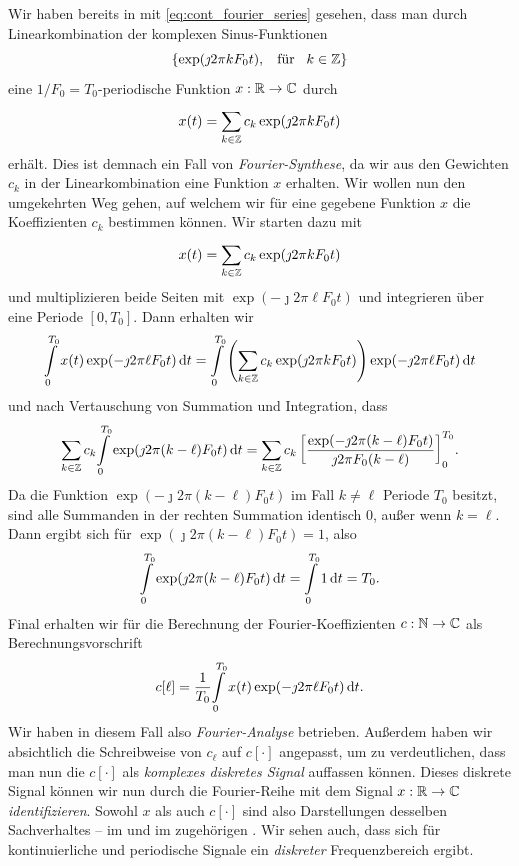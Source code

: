 Wir haben bereits in  mit \eqref{eq:cont_fourier_series} gesehen, dass man durch Linearkombination der komplexen Sinus-Funktionen
\[
\{\exp(\jmath 2 \pi k F_0 t), {\hspace{3mm} \text{f\"ur} \hspace{3mm}} k \in \mathbb{Z}\}
\]
eine $1/F_0=T_0$-periodische Funktion $x: \mathbb{R} \rightarrow \mathbb{C}$ durch
\[
x(t) = {\sum\limits_{k \in \mathbb{Z}}^{}{c_k \exp(\jmath 2 \pi k F_0 t)}}
\]
erhält.
Dies ist demnach ein Fall von \emph{Fourier-Synthese}, da wir aus den Gewichten $c_k$ in der Linearkombination eine Funktion $x$ erhalten.
Wir wollen nun den umgekehrten Weg gehen, auf welchem wir für eine gegebene Funktion $x$ die Koeffizienten $c_k$ bestimmen können.
Wir starten dazu mit 
\begin{equation}\label{eq:fourier:fourier_series}
    x(t) = {\sum\limits_{k \in \mathbb{Z}}^{}{
        c_k \exp(\jmath 2 \pi k F_0 t)
    }}
\end{equation}
und multiplizieren beide Seiten mit $\exp(-\jmath 2 \pi \ell F_0 t)$ und integrieren über eine Periode $[0,T_0]$.
Dann erhalten wir
\[
{\int\limits_{0}^{T_0}{
    x(t) \exp(-\jmath 2 \pi \ell F_0 t)
}\,\mathrm{d}{t}} 
= {\int\limits_{0}^{T_0}{
    \left(
        {\sum\limits_{k \in \mathbb{Z}}^{}{
            c_k \exp(\jmath 2 \pi k F_0 t)
        }}
    \right)
    \exp(-\jmath 2 \pi \ell F_0 t)
}\,\mathrm{d}{t}} 
\]
und nach Vertauschung von Summation und Integration, dass
\[
{\sum\limits_{k \in \mathbb{Z}}^{}{
    c_k 
    {\int\limits_{0}^{T_0}{\exp(\jmath 2 \pi (k - \ell) F_0 t)}\,\mathrm{d}{t}}
}}
= {\sum\limits_{k \in \mathbb{Z}}^{}{
    c_k \left[
        \frac{
            \exp(-\jmath 2 \pi (k - \ell) F_0 t)
        }{
            \jmath 2 \pi F_0(k - \ell)
        }
    \right]_{0}^{T_0}
}}.
\]
Da die Funktion $\exp(-\jmath 2 \pi (k - \ell) F_0 t)$ im Fall $k \neq  \ell$ Periode $T_0$ besitzt, sind alle Summanden in der rechten Summation identisch $0$, außer wenn $k = \ell$.
Dann ergibt sich für $\exp(\jmath 2 \pi (k - \ell) F_0 t) = 1$, also
\[
{\int\limits_{0}^{T_0}{\exp(\jmath 2 \pi (k - \ell) F_0 t)}\,\mathrm{d}{t}} 
    = {\int\limits_{0}^{T_0}{1}\,\mathrm{d}{t}} 
    = T_0.
\]
Final erhalten wir für die Berechnung der Fourier-Koeffizienten $c : \mathbb{N} \rightarrow \mathbb{C}$ als Berechnungsvorschrift
\[
    c[\ell] = \frac{1}{T_0}{\int\limits_{0}^{T_0}{
        x(t) \exp(-\jmath 2 \pi \ell F_0 t)
    }\,\mathrm{d}{t}}.
\]
Wir haben in diesem Fall also \emph{Fourier-Analyse} betrieben.
Außerdem haben wir absichtlich die Schreibweise von $c_\ell$ auf $c[\cdot]$ angepasst, um zu verdeutlichen, dass man nun die $c[\cdot]$ als \emph{komplexes diskretes Signal} auffassen können.
Dieses diskrete Signal können wir nun durch die Fourier-Reihe mit dem Signal $x : \mathbb{R} \rightarrow \mathbb{C}$ \emph{identifizieren}.
Sowohl $x$ als auch $c[\cdot]$ sind also Darstellungen desselben Sachverhaltes -- im  und im zugehörigen .
Wir sehen auch, dass sich für kontinuierliche und periodische Signale ein \emph{diskreter} Frequenzbereich ergibt.

